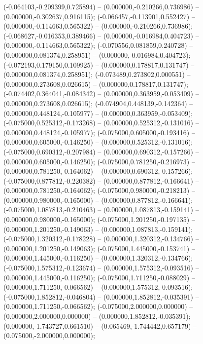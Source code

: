  (-0.064103,-0.209399,0.725894) -- (0.000000,-0.210266,0.736986) -- (0.000000,-0.302637,0.916115);
 (-0.066457,-0.113901,0.552427) -- (0.000000,-0.114663,0.565322) -- (0.000000,-0.210266,0.736986);
 (-0.068627,-0.016353,0.389466) -- (0.000000,-0.016984,0.404723) -- (0.000000,-0.114663,0.565322);
 (-0.070556,0.081859,0.240728) -- (0.000000,0.081374,0.258951) -- (0.000000,-0.016984,0.404723);
 (-0.072193,0.179150,0.109925) -- (0.000000,0.178817,0.131747) -- (0.000000,0.081374,0.258951);
 (-0.073489,0.273802,0.000551) -- (0.000000,0.273608,0.026615) -- (0.000000,0.178817,0.131747);
 (-0.074402,0.364041,-0.084342) -- (0.000000,0.363959,-0.053409) -- (0.000000,0.273608,0.026615);
 (-0.074904,0.448139,-0.142364) -- (0.000000,0.448124,-0.105977) -- (0.000000,0.363959,-0.053409);
 (-0.075000,0.525312,-0.173268) -- (0.000000,0.525312,-0.131016) -- (0.000000,0.448124,-0.105977);
 (-0.075000,0.605000,-0.193416) -- (0.000000,0.605000,-0.146250) -- (0.000000,0.525312,-0.131016);
 (-0.075000,0.690312,-0.207984) -- (0.000000,0.690312,-0.157266) -- (0.000000,0.605000,-0.146250);
 (-0.075000,0.781250,-0.216973) -- (0.000000,0.781250,-0.164062) -- (0.000000,0.690312,-0.157266);
 (-0.075000,0.877812,-0.220382) -- (0.000000,0.877812,-0.166641) -- (0.000000,0.781250,-0.164062);
 (-0.075000,0.980000,-0.218213) -- (0.000000,0.980000,-0.165000) -- (0.000000,0.877812,-0.166641);
 (-0.075000,1.087813,-0.210463) -- (0.000000,1.087813,-0.159141) -- (0.000000,0.980000,-0.165000);
 (-0.075000,1.201250,-0.197135) -- (0.000000,1.201250,-0.149063) -- (0.000000,1.087813,-0.159141);
 (-0.075000,1.320312,-0.178228) -- (0.000000,1.320312,-0.134766) -- (0.000000,1.201250,-0.149063);
 (-0.075000,1.445000,-0.153741) -- (0.000000,1.445000,-0.116250) -- (0.000000,1.320312,-0.134766);
 (-0.075000,1.575312,-0.123674) -- (0.000000,1.575312,-0.093516) -- (0.000000,1.445000,-0.116250);
 (-0.075000,1.711250,-0.088029) -- (0.000000,1.711250,-0.066562) -- (0.000000,1.575312,-0.093516);
 (-0.075000,1.852812,-0.046804) -- (0.000000,1.852812,-0.035391) -- (0.000000,1.711250,-0.066562);
 (-0.075000,2.000000,0.000000) -- (0.000000,2.000000,0.000000) -- (0.000000,1.852812,-0.035391);
 (0.000000,-1.743727,0.661510) -- (0.065469,-1.744442,0.657179) -- (0.075000,-2.000000,0.000000);
